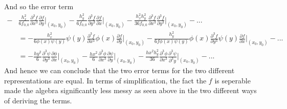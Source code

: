 \documentclass[12pt]{article}
\begin{document}
\begin{enumerate}
\begin{enumerate}
\begin{equation*}
        \end{equation*}
        And so the error term 
        \begin{align*}
            -&\frac{h_x^2}{6f_{0,0}}\frac{\partial^3f}{\partial x^3}\frac{\partial f}{\partial y}\bigg|_{(x_0,y_0)}-\frac{h_y^2}{6f_{0,0}}\frac{\partial^3f}{\partial y^3}\frac{\partial f}{\partial x}\bigg|_{(x_0,y_0)}-\frac{h_x^2h_y^2}{36f_{0,0}}\frac{\partial^3f}{\partial x^3}\frac{\partial^3f}{\partial y^3}\bigg|_{(x_0,y_0)}-...\\
            &=-\frac{h_x^2}{6\phi(x)\psi(y)}\psi(y)\frac{\partial^3f}{\partial x^3}\phi(x)\frac{\partial f}{\partial y}\bigg|_{(x_0,y_0)}-\frac{h_y^2}{6f\phi(x)\psi(y)}\phi(x)\frac{\partial^3f}{\partial y^3}\psi(y)\frac{\partial f}{\partial x}\bigg|_{(x_0,y_0)}-...\\
            &=-\frac{hy^2}{6}\frac{\partial^3\psi}{\partial y^3}\frac{\partial\phi}{\partial x}\bigg|_{(x_0,y_0)}-\frac{hx^2}{6}\frac{\partial^3\phi}{\partial x^3}\frac{\partial\psi}{\partial y}\bigg|_{(x_0,y_0)}-\frac{hx^2h_y^2}{36}\frac{\partial^3\phi}{\partial x^3}\frac{\partial^3\psi}{\partial^3 y}\bigg|_{(x_0,y_0)}-...
        \end{align*}
        And hence we can conclude that the two error terms for the two different representations are equal. In terms of simplification, the fact the $f$ is seperable made the algebra significantly less messy as seen above in the two different ways of deriving the terms.

        
        

\end{enumerate}
\end{enumerate}
\end{document}
